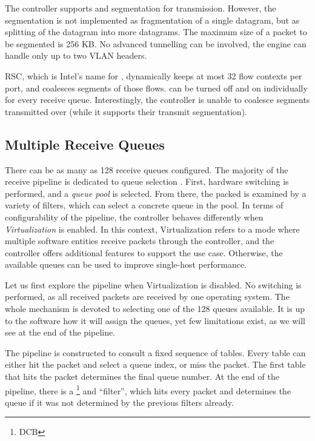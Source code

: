 The controller supports  and  segmentation for transmission. However, the
 segmentation is not implemented as  fragmentation of
a single datagram, but as splitting of the  datagram into more datagrams.
The maximum size of a packet to be segmented is 256 KB. No advanced tunnelling can
be involved, the engine can handle only up to two VLAN headers.

\acrfull{RSC}, which is Intel's name for , dynamically keeps at most
32 flow contexts per port, and coalesces  segments of those flows.
 can be turned off and on individually for every receive queue.
Interestingly, the controller is unable to coalesce  segments transmitted
over  (while it supports their transmit segmentation).

\subsection{Multiple Receive Queues}

There can be as many as 128 receive queues configured. The majority of the receive
pipeline is dedicated to queue selection . First, hardware
switching is performed, and a \emph{queue pool} is selected. From there, the
packed is examined by a variety of filters, which can select a concrete queue
in the pool. In terms of configurability of the pipeline, the controller behaves
differently when \emph{Virtualization} is enabled. In this context, Virtualization
refers to a mode where multiple software entities receive packets through the
controller, and the controller offers additional features to support the use
case. Otherwise, the available queues can be used to improve
single-host performance.

Let us first explore the pipeline when Virtualization is disabled. No switching
is performed, as all received packets are received by one operating system.
The whole mechanism is devoted to selecting one of the 128
queues available. It is up to the software how it will assign the queues, yet
few limitations exist, as we will see at the end of the pipeline.

The pipeline is constructed to consult a fixed sequence of tables.
Every table can either hit the packet and select a queue index, or miss the
packet. The first table that hits the packet determines the final queue  number. At the
end of the pipeline, there is a \footnote{\acrlong{DCB}} and  ``filter'', which hits
every packet and determines the queue if it was not determined by the previous
filters already.

